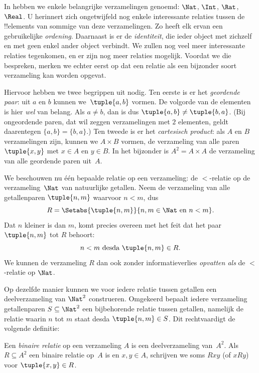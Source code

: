 \documentclass[openany]{memoir}
\begin{document}
\begin{explain}
In  hebben we enkele belangrijke
verzamelingen genoemd: $\Nat$, $\Int$, $\Rat$, $\Real$. U herinnert
zich ongetwijfeld nog enkele interessante relaties tussen de !!{element}s
van sommige van deze verzamelingen. Zo heeft elk ervan een gebruikelijke
\emph{ordening}. Daarnaast is er de \emph{identiteit}, die ieder object
met zichzelf en met geen enkel ander object verbindt. We zullen nog veel meer
interessante relaties tegenkomen, en er zijn nog meer relaties mogelijk.
Voordat we die bespreken, merken we echter eerst op dat een relatie als een
bijzonder soort verzameling kan worden opgevat.
  
Hiervoor hebben we twee begrippen uit  nodig.
Ten eerste is er het \emph{geordende paar}: uit $a$ en $b$ kunnen
we~$\tuple{a, b}$ vormen. De volgorde van de elementen is hier
\emph{wel} van belang. Als $a \neq b$, dan is dus $\tuple{a, b} \neq
\tuple{b, a}$. (Bij ongeordende paren, dat wil zeggen verzamelingen met
$2$ elementen, geldt daarentegen $\{a, b\}=\{b, a\}$.) Ten tweede is er het
\emph{cartesisch product}: als $A$ en $B$ verzamelingen zijn, kunnen we
$A \times B$ vormen, de verzameling van alle paren $\tuple{x, y}$ met
$x \in A$ en $y \in B$. In het bijzonder is $A^{2}= A \times A$ de
verzameling van alle geordende paren uit~$A$.
  
We beschouwen nu één bepaalde relatie op een verzameling: de
$<$-relatie op de verzameling~$\Nat$ van natuurlijke getallen. Neem de
verzameling van alle getallenparen $\tuple{n, m}$ waarvoor $n<m$, dus
\[
  R=\Setabs{\tuple{n, m}}{n, m \in \Nat \text{ en } n<m}.
\]
Dat $n$ kleiner is dan $m$, komt precies overeen met het feit dat het
paar $\tuple{n, m}$ tot $R$ behoort:
\[
      n<m\text{ desda }\tuple{n, m} \in R.
\]
We kunnen de verzameling $R$ dan ook zonder informatieverlies
\emph{opvatten als} de $<$-relatie op $\Nat$.

Op dezelfde manier kunnen we voor iedere relatie tussen getallen een
deelverzameling van $\Nat^{2}$ construeren. Omgekeerd bepaalt iedere
verzameling getallenparen $S \subseteq \Nat^{2}$ een bijbehorende
relatie tussen getallen, namelijk de relatie waarin $n$ tot $m$ staat
desda $\tuple{n, m} \in S$. Dit rechtvaardigt de volgende definitie:
\end{explain}
  
\begin{defn}
Een \emph{binaire relatie} op een verzameling $A$ is een
deelverzameling van~$A^{2}$. Als $R \subseteq A^{2}$ een binaire
relatie op~$A$ is en $x, y \in A$, schrijven we soms $Rxy$ (of $xRy$)
voor $\tuple{x, y} \in R$.
\end{defn}
  
\end{document}
